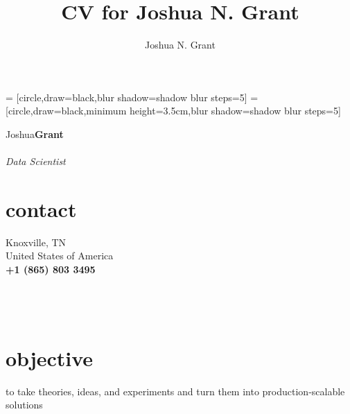 \documentclass[8pt]{article}
\author{Joshua N. Grant}
\title{CV for Joshua N. Grant}
\begin{document}
% 
% 
 = [circle,draw=black,blur shadow={shadow blur steps=5}]%
 = [circle,draw=black,minimum height=3.5cm,blur shadow={shadow blur steps=5}]%
\begin{minipage}[ht]{.25\linewidth}%
  \setlength{\headsep}{-10pt}
  \setlength{\voffset}{-0.75in}
   {\Large Joshua\LARGE\textbf{Grant}} \\ \\
   {\large \textit{Data Scientist}}
   \section*{\faUser{} contact}%
     \flushright
     Knoxville, TN \\
     United States of America  \\
     \textbf{+1 (865) 803 3495} \faMobile \\
     \href{mailto:jngrant9@gmail.com}{\color{linkcolor}{jngrant9@gmail.com \faEnvelope}} \\
     \href{http://notjustadatum.blogspot.com}{\color{linkcolor}{notjustadatum.blogspot.com \faBold}} \\
     \href{http://github.com/sempervent}{\color{linkcolor}{github.com/sempervent \faGithubAlt}} \\
     \href{https://www.linkedin.com/in/joshua-grant-a3842968/}{\color{linkcolor}{\footnotesize linkedin.com/in/joshuanagrant} \faLinkedin}
     \flushleft%
   \section*{\faBullseye{} objective}%
   \flushright
   to take theories, ideas, and experiments and turn them into production-scalable solutions
   \flushleft

\end{minipage}
\end{document}
